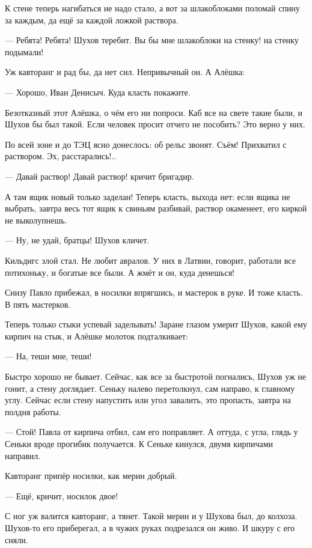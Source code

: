 К стене теперь нагибаться не надо стало, а вот за шлакоблоками \dash поломай спину за каждым, да
ещё за каждой ложкой раствора.

--- Ребята! Ребята! \dash Шухов теребит. \Dash Вы бы мне шлакоблоки на стенку! на стенку подымали!

Уж кавторанг и рад бы, да нет сил. Непривычный он. А Алёшка:

--- Хорошо, Иван Денисыч. Куда класть \dash покажите.

Безотказный этот Алёшка, о чём его ни попроси. Каб все на свете такие были, и Шухов бы был
такой. Если человек просит \dash отчего не пособить? Это верно у них.

По всей зоне и до ТЭЦ ясно донеслось: об рельс звонят. Съём! Прихватил с раствором. Эх,
расстарались!..

--- Давай раствор! Давай раствор! \dash кричит бригадир.

А там ящик новый только заделан! Теперь \dash класть, выхода нет: если ящика не выбрать, завтра
весь тот ящик к свиньям разбивай, раствор окаменеет, его киркой не выколупнешь.

--- Ну, не удай, братцы! \dash Шухов кличет.

Кильдигс злой стал. Не любит авралов. У них в Латвии, говорит, работали все потихоньку, и
богатые все были. А жмёт и он, куда денешься!

Снизу Павло прибежал, в носилки впрягшись, и мастерок в руке. И тоже класть. В пять мастерков.

Теперь только стыки успевай заделывать! Заране глазом умерит Шухов, какой ему кирпич на
стык, и Алёшке молоток подталкивает:

--- На, теши мне, теши!

Быстро \dash хорошо не бывает. Сейчас, как все за быстротой погнались, Шухов уж не гонит, а стену
доглядает. Сеньку налево перетолкнул, сам \dash направо, к главному углу. Сейчас если стену
напустить или угол завалить, \dash это пропасть, завтра на полдня работы.

--- Стой! \dash Павла от кирпича отбил, сам его поправляет. А оттуда, с угла, глядь \dash у Сеньки вроде
прогибик получается. К Сеньке кинулся, двумя кирпичами направил.

Кавторанг припёр носилки, как мерин добрый.

--- Ещё, \dash кричит, \Dash носилок двое!

С ног уж валится кавторанг, а тянет. Такой мерин и у Шухова был, до колхоза. Шухов-то его
приберегал, а в чужих руках подрезался он живо. И шкуру с его сняли.

